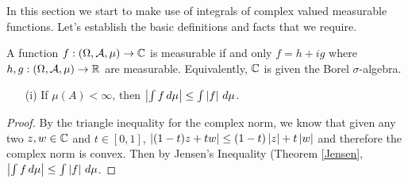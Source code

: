 In this section we start to make use of integrals of complex valued
measurable functions.  Let's establish the basic definitions and facts
that we require.
\begin{defn}A function $f : (\Omega, \mathcal{A}, \mu) \to \mathbb{C}$
  is measurable if and only $f = h + i g$ where $h,g : (\Omega,
  \mathcal{A}, \mu) \to \mathbb{R}$ are measurable.  Equivalently,
  $\mathbb{C}$ is given the Borel $\sigma$-algebra.
\begin{itemize}
\item[(i)] If $\mu(A) < \infty$, then $\left \vert \int f \, d\mu \right \vert \leq \int
  \left \vert f \right \vert \, d\mu$.
\end{itemize}
\end{defn}
\begin{proof}
By the triangle inequality for the complex norm, we know that given
any two $z,w \in \mathbb{C}$ and $t \in [0,1]$, $\left \vert (1-t) z + t w \right \vert
\leq (1-t) \left \vert z \right \vert + t \left \vert w \right \vert$ and therefore the complex norm is
convex.  Then by Jensen's Inequality (Theorem \ref{Jensen}, $\left \vert \int f \, d\mu \right \vert \leq \int
\left \vert f \right \vert \, d\mu$.
\end{proof}

